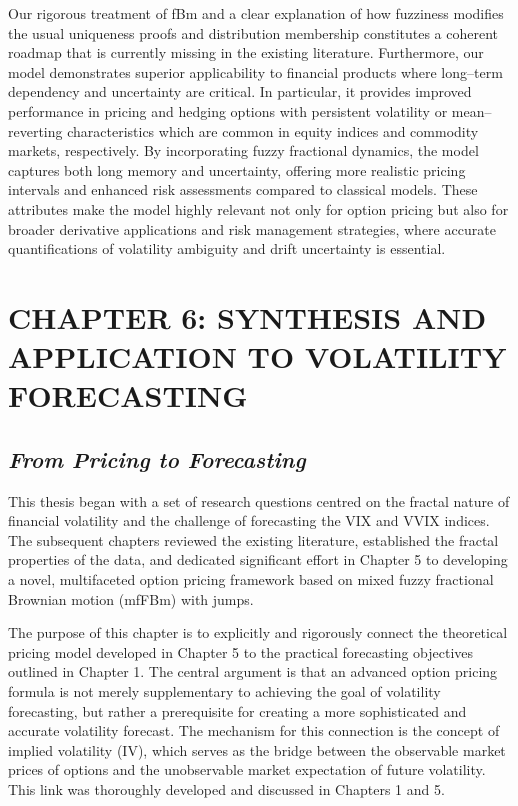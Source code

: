 \documentclass[12pt,a4paper]{report}
\numberwithin{equation}{section}
\begin{document}
Our rigorous treatment of fBm and a clear explanation of how fuzziness
modifies the usual uniqueness proofs and distribution membership
constitutes a coherent roadmap that is currently missing in the existing
literature. Furthermore, our model demonstrates superior applicability
to financial products where long--term dependency and uncertainty are
critical. In particular, it provides improved performance in pricing and
hedging options with persistent volatility or mean--reverting
characteristics which are common in equity indices and commodity
markets, respectively. By incorporating fuzzy fractional dynamics, the
model captures both long memory and uncertainty, offering more realistic
pricing intervals and enhanced risk assessments compared to classical
models. These attributes make the model highly relevant not only for
option pricing but also for broader derivative applications and risk
management strategies, where accurate quantifications of volatility
ambiguity and drift uncertainty is essential.

\hypertarget{chapter--6--synthesis--and--application--to--volatility--forecasting}{%
\chapter{\texorpdfstring{
\textbf{CHAPTER 6: SYNTHESIS AND APPLICATION TO VOLATILITY
FORECASTING}}{ CHAPTER 6: SYNTHESIS AND APPLICATION TO VOLATILITY FORECASTING}}\label{chapter--6--synthesis--and--application--to--volatility--forecasting}}

\hypertarget{from--pricing--to--forecasting}{%
\section{\texorpdfstring{\emph{\textbf{From Pricing to
Forecasting}}}{From Pricing to Forecasting}}\label{from--pricing--to--forecasting}}

This thesis began with a set of research questions centred on the
fractal nature of financial volatility and the challenge of forecasting
the VIX and VVIX indices. The subsequent chapters reviewed the existing
literature, established the fractal properties of the data, and
dedicated significant effort in Chapter 5 to developing a novel,
multifaceted option pricing framework based on mixed fuzzy fractional
Brownian motion (mfFBm) with jumps.

The purpose of this chapter is to explicitly and rigorously connect the
theoretical pricing model developed in Chapter 5 to the practical
forecasting objectives outlined in Chapter 1. The central argument is
that an advanced option pricing formula is not merely supplementary to
achieving the goal of volatility forecasting, but rather a prerequisite
for creating a more sophisticated and accurate volatility forecast. The
mechanism for this connection is the concept of implied volatility (IV),
which serves as the bridge between the observable market prices of
options and the unobservable market expectation of future volatility.
This link was thoroughly developed and discussed in Chapters 1 and 5.
\end{document}
